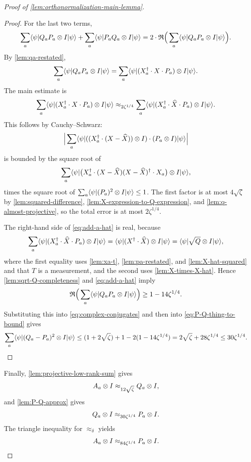 \begin{proof}[Proof of \ref{lem:orthonormalization-main-lemma}]
\begin{proof}
		For the last two terms,
		\begin{equation}\label{eq:complex-conjugates}
			\sum_a \langle \psi \rvert Q_aP_a \otimes I \lvert \psi \rangle
			+
			\sum_a \langle \psi \rvert P_aQ_a \otimes I \lvert \psi \rangle
			=
			2 \cdot \mathfrak{R}\Big(\sum_a \langle \psi \rvert Q_aP_a \otimes I \lvert \psi \rangle\Big).
		\end{equation}
		By \ref{lem:qa-restated},
		\[
			\sum_a \langle \psi \rvert Q_aP_a \otimes I \lvert \psi \rangle
			=
			\sum_a \langle \psi \rvert (X_a^\dagger \cdot X \cdot P_a) \otimes I \lvert \psi \rangle.
		\]
		The main estimate is
		\begin{equation}\label{eq:add-a-hat}
			\sum_a \langle \psi \rvert (X_a^\dagger \cdot X \cdot P_a)\otimes I \lvert \psi \rangle
			\approx_{2\zeta^{1/4}}
			\sum_a \langle \psi \rvert (X_a^\dagger \cdot \widehat{X} \cdot P_a)\otimes I \lvert \psi \rangle.
		\end{equation}
		This follows by Cauchy--Schwarz:
		\[
			\Big|\sum_a \langle \psi \rvert ((X_a^\dagger \cdot (X-\widehat X)) \otimes I)\cdot(P_a \otimes I)\lvert \psi \rangle\Big|
		\]
		is bounded by the square root of
		\[
			\sum_a \langle \psi \rvert \big(X_a^\dagger \cdot (X-\widehat X)(X-\widehat X)^\dagger \cdot X_a\big)\otimes I \lvert \psi \rangle,
		\]
		times the square root of $\sum_a \langle \psi \rvert(P_a)^2 \otimes I \lvert \psi \rangle \leq 1$. The first factor is at most $4\sqrt{\zeta}$ by \ref{lem:squared-difference}, \ref{lem:X-expression-to-Q-expression}, and \ref{lem:q-almost-projective}, so the total error is at most $2\zeta^{1/4}$.

		The right-hand side of \ref{eq:add-a-hat} is real, because
		\[
			\sum_a \langle \psi \rvert (X_a^\dagger \cdot \widehat{X} \cdot P_a)\otimes I \lvert \psi \rangle
			=
			\langle \psi \rvert (X^\dagger \cdot \widehat{X}) \otimes I \lvert \psi \rangle
			=
			\langle \psi \rvert \sqrt{Q} \otimes I \lvert \psi \rangle,
		\]
		where the first equality uses \ref{lem:xa-t}, \ref{lem:pa-restated}, and \ref{lem:X-hat-squared} and that $T$ is a measurement, and the second uses \ref{lem:X-times-X-hat}. Hence \ref{lem:sqrt-Q-completeness} and \ref{eq:add-a-hat} imply
		\[
			\mathfrak{R}\Big(\sum_a \langle \psi \rvert Q_aP_a \otimes I \lvert \psi \rangle\Big)
			\geq
			1-14\zeta^{1/4}.
		\]
		Substituting this into \ref{eq:complex-conjugates} and then into \ref{eq:P-Q-thing-to-bound} gives
		\[
			\sum_a \langle \psi \rvert (Q_a-P_a)^2 \otimes I \lvert \psi \rangle
			\leq
			(1+2\sqrt{\zeta}) + 1 - 2(1-14\zeta^{1/4})
			=
			2\sqrt{\zeta} + 28\zeta^{1/4}
			\leq
			30\zeta^{1/4}.
		\]
	\end{proof}

	Finally, \ref{lem:projective-low-rank-sum} gives
	\[
		A_a \otimes I \approx_{12\sqrt{\zeta}} Q_a \otimes I,
	\]
	and \ref{lem:P-Q-approx} gives
	\[
		Q_a \otimes I \approx_{30\zeta^{1/4}} P_a \otimes I.
	\]
	The triangle inequality for $\approx_\delta$ yields
	\[
		A_a \otimes I \approx_{84\zeta^{1/4}} P_a \otimes I.
	\]
\end{proof}
